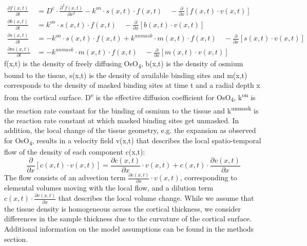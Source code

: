 \documentclass{article}
\begin{document}
\begin{align*}
\frac{\partial f(x,t)}{\partial t} &= D^{e}\cdot\frac{\partial^{2} f(x,t)}{\partial x^{2}} - k^{on}\cdot s(x,t)\cdot f(x,t) \quad - \frac{\partial}{\partial x}\left[f\left(x,t\right)\cdot v\left(x,t\right)\right] \tag{2}\\
\frac{\partial b(x,t)}{\partial t} &= k^{on}\cdot s(x,t)\cdot f(x,t) \quad - \frac{\partial}{\partial x}\left[b\left(x,t\right)\cdot v\left(x,t\right)\right] \tag{3}\\
\frac{\partial s(x,t)}{\partial t} &= -k^{on}\cdot s(x,t)\cdot f(x,t) + k^{unmask}\cdot m(x,t)\cdot f(x,t) \quad - \frac{\partial}{\partial x}\left[s\left(x,t\right)\cdot v\left(x,t\right)\right] \tag{4}\\
\frac{\partial m(x,t)}{\partial t} &= -k^{unmask}\cdot m(x,t)\cdot f(x,t) \quad - \frac{\partial}{\partial x}\left[m\left(x,t\right)\cdot v\left(x,t\right)\right] \tag{5}
\end{align*}
f(x,t) is the density of freely diffusing OsO\textsubscript{4}, b(x,t) is the density of osmium bound to the tissue, s(x,t) is the density of available binding sites and m(x,t) corresponds to the density of masked binding sites at time t and a radial depth x from the cortical surface. D\textsuperscript{e} is the effective diffusion coefficient for OsO\textsubscript{4}, k\textsuperscript{on} is the reaction rate constant for the binding of osmium to the tissue and k\textsuperscript{unmask} is the reaction rate constant at which masked binding sites get unmasked. In addition, the local change of the tissue geometry, e.g. the expansion as observed for OsO\textsubscript{4}, results in a velocity field v(x,t) that describes the local spatio-temporal flow of the density of each component c(x,t):
\begin{equation*}
\frac{\partial}{\partial x}\left[c\left(x,t\right)\cdot v\left(x,t\right)\right] = \frac{\partial c(x,t)}{\partial x}\cdot v\left(x,t\right) + c\left(x,t\right)\cdot\frac{\partial v(x,t)}{\partial x} \tag{6}
\end{equation*}
The flow consists of an advection term $\frac{\partial c(x,t)}{\partial x}\cdot v\left(x,t\right)$, corresponding to elemental volumes moving with the local flow, and a dilution term $c\left(x,t\right)\cdot\frac{\partial v(x,t)}{\partial x}$ that describes the local volume change. While we assume that the tissue density is homogeneous across the cortical thickness, we consider differences in the sample thickness due to the curvature of the cortical surface. Additional information on the model assumptions can be found in the methods section.
\end{document}
